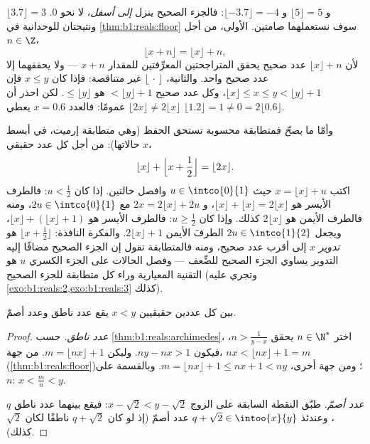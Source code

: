 \begin{example}\label{ex:b1:reals:floorpractice}
$\lfloor 3.7 \rfloor = 3$ و $\lfloor 5 \rfloor = 5$ و $\lfloor
-3.7 \rfloor = -4$: فالجزء الصحيح ينزل \emph{إلى أسفل}، لا نحو $0$.
ونتيجتان للوحدانية في \cref{thm:b1:reals:floor} سوف
نستعملهما صامتين. الأولى، من أجل $n \in \Z$،
\[
\lfloor x + n \rfloor = \lfloor x \rfloor + n ,
\]
لأن $\lfloor x \rfloor + n$ عدد صحيح يحقق المتراجحتين
المعرِّفتين للمقدار $x + n$ --- ولا يحققهما إلا عدد صحيح واحد.
والثانية، $\lfloor \, \cdot \, \rfloor$ غير متناقصة: فإذا كان $x \leq
y$ فإن $\lfloor x \rfloor \leq x \leq y < \lfloor y \rfloor + 1$،
وكل عدد صحيح $< \lfloor y \rfloor + 1$ هو $\leq \lfloor y
\rfloor$. لكن احذر أن $\lfloor 2x \rfloor \neq 2\lfloor
x \rfloor$ عمومًا: فالعدد $x = 0.6$ يعطي $\lfloor 1.2 \rfloor = 1
\neq 0 = 2\lfloor 0.6 \rfloor$.

وأمّا ما \emph{يصحّ} فمتطابقة محسوبة تستحق الحفظ (وهي متطابقة إرميت،
في أبسط حالاتها): من أجل كل عدد حقيقي $x$،
\[
\lfloor x \rfloor + \Bigl\lfloor x + \frac12 \Bigr\rfloor
= \lfloor 2x \rfloor .
\]
اكتب $x = \lfloor x\rfloor + u$ حيث $u \in \intco{0}{1}$ وافصل
حالتين. إذا كان $u < \frac12$: فالطرف الأيسر هو $\lfloor
x\rfloor + \lfloor x\rfloor = 2\lfloor x\rfloor$، و $2x =
2\lfloor x\rfloor + 2u$ مع $2u \in \intco{0}{1}$، ومنه فالطرف
الأيمن هو $2\lfloor x\rfloor$ كذلك. وإذا كان $u \geq \frac12$: فالطرف
الأيسر هو $\lfloor x\rfloor + (\lfloor x\rfloor + 1)$، ويجعل $2u \in
\intco{1}{2}$ الطرفَ الأيمن $2\lfloor x\rfloor + 1$. والفكرة
النافذة: $\lfloor x + \frac12\rfloor$ هو \emph{تدوير}
$x$ إلى أقرب عدد صحيح، ومنه فالمتطابقة تقول
إن الجزء الصحيح مضافًا إليه التدوير يساوي الجزء الصحيح للضِّعف ---
وفصل الحالات على الجزء الكسري $u$ هو التقنية المعيارية
وراء كل متطابقة للجزء الصحيح
(وتجري عليه \cref{exo:b1:reals:2,exo:b1:reals:3} كذلك).
\end{example}

\begin{theorem}\label{thm:b1:reals:density}
بين كل عددين حقيقيين $x < y$ يقع عدد ناطق وعدد
أصمّ.
\end{theorem}

\begin{proof}
\emph{عدد ناطق.} حسب \cref{thm:b1:reals:archimedes}، اختر $n \in
\N^*$ يحقق $n > \frac{1}{y - x}$، فيكون $ny - nx > 1$. وليكن $m = \lfloor
nx \rfloor + 1$. من جهة، $nx < \lfloor nx \rfloor + 1 = m$
(\cref{thm:b1:reals:floor})؛ ومن جهة أخرى، $m = \lfloor nx \rfloor +
1 \leq nx + 1 < ny$. وبالقسمة على $n$: $x < \frac mn < y$.

\emph{عدد أصمّ.} طبّق النقطة السابقة على الزوج $x -
\sqrt 2 < y - \sqrt 2$: فيقع بينهما عدد ناطق $q$، وعندئذ
$q + \sqrt 2 \in \intoo{x}{y}$ عدد أصمّ (إذ لو كان $q + \sqrt 2$
ناطقًا لكان $\sqrt 2$ كذلك).
\end{proof}

